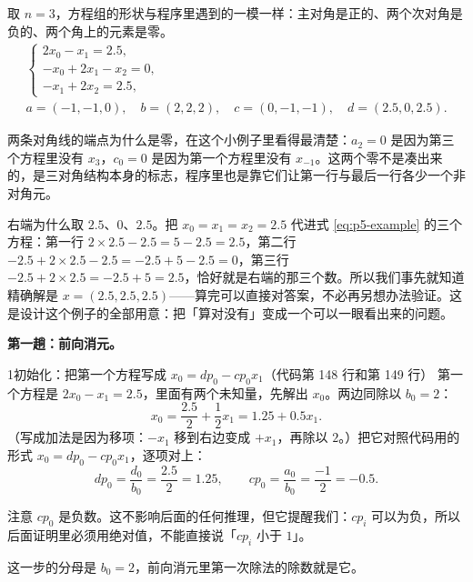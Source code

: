 取 $n=3$，方程组的形状与程序里遇到的一模一样：主对角是正的、两个次对角是负的、两个角上的元素是零。
\begin{equation}
\begin{gathered}
\begin{cases}2x_0-x_1=2.5,\\ -x_0+2x_1-x_2=0,\\ -x_1+2x_2=2.5,\end{cases}\\[6pt]
a=\left(-1,-1,0\right),\quad b=\left(2,2,2\right),\quad c=\left(0,-1,-1\right),\quad d=\left(2.5,0,2.5\right).
\end{gathered}
\label{eq:p5-example}
\end{equation}

两条对角线的端点为什么是零，在这个小例子里看得最清楚：$a_2=0$ 是因为第三个方程里没有 $x_3$，$c_0=0$ 是因为第一个方程里没有 $x_{-1}$。这两个零不是凑出来的，是三对角结构本身的标志，程序里也是靠它们让第一行与最后一行各少一个非对角元。

右端为什么取 $2.5$、$0$、$2.5$。把 $x_0=x_1=x_2=2.5$ 代进式 \eqref{eq:p5-example} 的三个方程：第一行 $2\times2.5-2.5=5-2.5=2.5$，第二行 $-2.5+2\times2.5-2.5=-2.5+5-2.5=0$，第三行 $-2.5+2\times2.5=-2.5+5=2.5$，恰好就是右端的那三个数。所以我们事先就知道精确解是 $x=(2.5,2.5,2.5)$——算完可以直接对答案，不必再另想办法验证。这是设计这个例子的全部用意：把「算对没有」变成一个可以一眼看出来的问题。

\textbf{第一趟：前向消元。}

\begin{stepbox}{1}{初始化：把第一个方程写成 $x_0=dp_0-cp_0x_1$（代码第 148 行和第 149 行）}
第一个方程是 $2x_0-x_1=2.5$，里面有两个未知量，先解出 $x_0$。两边同除以 $b_0=2$：
\begin{equation}
x_0=\frac{2.5}{2}+\frac{1}{2}x_1=1.25+0.5x_1 .
\label{eq:p5-ex1}
\end{equation}
（写成加法是因为移项：$-x_1$ 移到右边变成 $+x_1$，再除以 $2$。）把它对照代码用的形式 $x_0=dp_0-cp_0x_1$，逐项对上：
\begin{equation}
dp_0=\frac{d_0}{b_0}=\frac{2.5}{2}=1.25,\qquad
cp_0=\frac{a_0}{b_0}=\frac{-1}{2}=-0.5 .
\label{eq:p5-ex1v}
\end{equation}

注意 $cp_0$ 是负数。这不影响后面的任何推理，但它提醒我们：$cp_i$ 可以为负，所以后面证明里必须用绝对值，不能直接说「$cp_i$ 小于 $1$」。

这一步的分母是 $b_0=2$，前向消元里第一次除法的除数就是它。
\end{stepbox}

